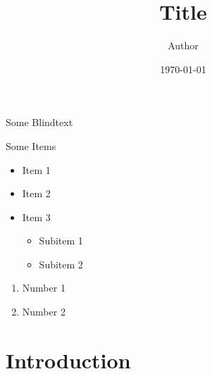 \documentclass{beamer}
\title{Title}
\author{Author}
\date{\today{}}
\begin{document}
\begin{frame}[plain]{}
    \maketitle
\end{frame}

\begin{frame}{Some Blindtext}
    \blindtext
\end{frame}

\begin{frame}{Some Items}
    \begin{itemize}
        \item Item 1
        \item Item 2
        \item Item 3
        \begin{itemize}
            \item Subitem 1
            \item Subitem 2
        \end{itemize}
    \end{itemize}

    \begin{enumerate}
        \item Number 1
        \item Number 2
    \end{enumerate}
\end{frame}

\section{Introduction}
\end{document}
